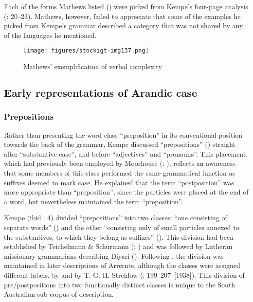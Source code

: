 Each of the forms Mathews listed () were picked from Kempe’s four-page analysis (\citeyear{kempe_grammar_1891}: 20--23). Mathews, however, failed to appreciate that some of the examples he picked from Kempe’s grammar described a category that was not shared by any of the languages he mentioned.

\begin{figure}
\texttt{[image: figures/stockigt-img137.png]}
\caption{Mathews' exemplification of verbal complexity \citeyearpar[334]{mathews_arranda_1907}}
\label{bkm:Ref456021260}\label{fig:key:9-188}
\end{figure}

\subsection{Early representations of Arandic case}
\label{sec:key:9.3.3}

\subsubsection{Prepositions}
\label{sec:key:9.3.3.1}\label{bkm:Ref331424200}

Rather than presenting the word-class “preposition” in its conventional position towards the back of the grammar, Kempe discussed “prepositions” (\citeyear[4--5]{kempe_grammar_1891}) straight after ``substantive case'', and before “adjectives” and “pronouns''. This placement, which had previously been employed by Moorhouse (\citeyear[2]{moorhouse_vocabulary_1846}; ), reflects an awareness that some members of this class performed the same grammatical function as suffixes deemed to mark case. He explained that the term ``postposition'' was more appropriate than ``preposition'', since the particles were placed at the end of a word, but nevertheless maintained the term ``preposition''.

Kempe (ibid.: 4) divided ``prepositions'' into two classes: “one consisting of separate words” () and the other “consisting only of small particles annexed to the substantives, to which they belong as suffixes” (). This division had been established by Teichelmann \& Schürmann (\citeyear{teichelmann_outlines_1840}; ) and was followed by Lutheran missionary-grammarians describing Diyari (). Following \citet[4--6]{kempe_grammar_1891}, the division was maintained in later descriptions of Arrernte, although the classes were assigned different labels, by \citet[335]{mathews_languages_1907} and by T. G. H. Strehlow (\citeyear{strehlow_aranda_1944}: 199--207~[1938]). This division of pre/postpositions into two functionally distinct classes is unique to the South Australian sub-corpus of description.


